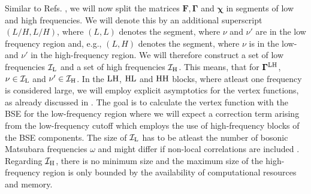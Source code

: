 \documentclass[../../main.tex]{subfiles}
\begin{document}
Similar to Refs. \cite{kunes, hummel DA, efficient BSE}, we will now split the matrices $\bm{F}, \bm{\Gamma}$ and $\bm{\chi}$ in segments of low and high frequencies. We will denote this by an additional superscript $(L/H, L/H)$, where $(L,L)$ denotes the segment, where $\nu$ and $\nu'$ are in the low frequency region and, e.g., $(L,H)$ denotes the segment, where $\nu$ is in the low- and $\nu'$ in the high-frequency region. We will therefore construct a set of low frequencies $\mathcal{I}_{\text{L}}$ and a set of high frequencies $\mathcal{I}_{\text{H}}$. This means, that for $\bm\Gamma^{\text{L}\text{H}}$, $\nu\in\mathcal{I}_{\text{L}}$ and $\nu'\in\mathcal{I}_{\text{H}}$. In the $\text{L}\text{H}$, $\text{H}\text{L}$ and $\text{H}\text{H}$ blocks, where atleast one frequency is considered large, we will employ explicit asymptotics for the vertex functions, as already discussed in . The goal is to calculate the vertex function with the BSE for the low-frequency region where we will expect a correction term arising from the low-frequency cutoff which employs the use of high-frequency blocks of the BSE components. The size of $\mathcal{I}_{\text{L}}$ has to be atleast the number of bosonic Matsubara frequencies $\omega$ \cite{efficient BSE} and might differ if non-local correlations are included \cite{kinza two-particle corr}. Regarding $\mathcal{I}_{\text{H}}$, there is no minimum size and the maximum size of the high-frequency region is only bounded by the availability of computational resources and memory. 
\end{document}
